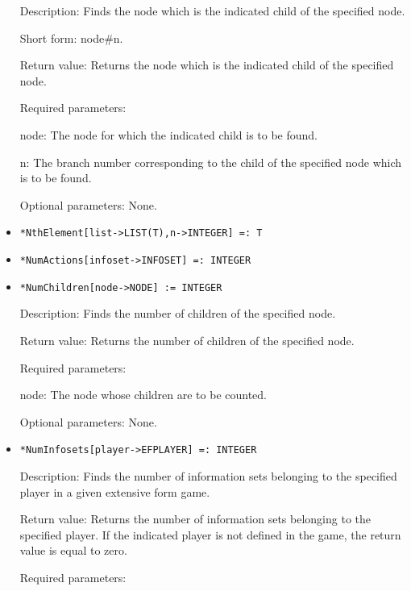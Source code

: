 \begin{itemize}
\bd
\item
[Description:] Finds the node which is the indicated child of the
specified node.  
\item
[Short form:] node\#n.
\item
[Return value:] Returns the node which is the indicated child of the
specified node.
\item
[Required parameters:]\hfil\null
	  
\bd
\item
[node:] The node for which the indicated child is to be found.
\item
[n:] The branch number corresponding to the child of the specified node
which is to be found.
\ed

\item 
[Optional parameters:] None.
\ed

\item
\protect \large \begin{verbatim}
*NthElement[list->LIST(T),n->INTEGER] =: T 
\end{verbatim}\normalsize

\item
\protect \large \begin{verbatim}
*NumActions[infoset->INFOSET] =: INTEGER
\end{verbatim}\normalsize

\item
\protect \large \begin{verbatim}
*NumChildren[node->NODE] := INTEGER
\end{verbatim}\normalsize

\bd
\item
[Description:] Finds the number of children of the specified node.
\item
[Return value:] Returns the number of children of the specified node.
\item
[Required parameters:]\hfil\null

\bd
\item
[node:] The node whose children are to be counted.
\ed

\item
[Optional parameters:] None.
\ed

\item
\protect \large \begin{verbatim}
*NumInfosets[player->EFPLAYER] =: INTEGER
\end{verbatim}\normalsize

\bd
\item
[Description:] Finds the number of information sets belonging to the
specified player in a given extensive form game.
\item
[Return value:] Returns the number of information sets belonging to
the specified player.  If the indicated player is not defined in the
game, the return value is equal to zero.
\item
[Required parameters:]\hfil\null


\end{itemize}
